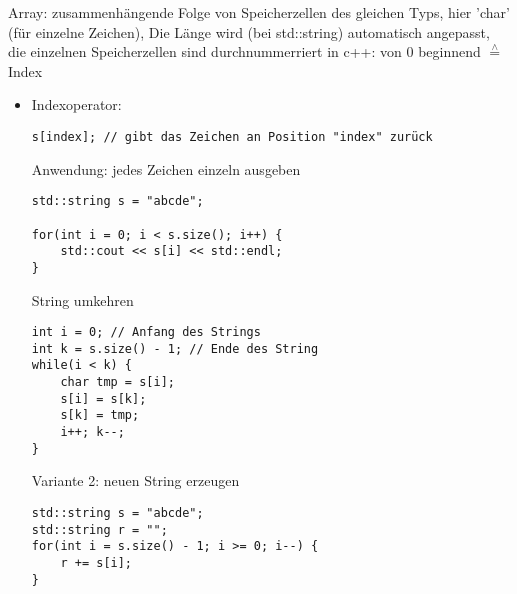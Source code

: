 \documentclass[a4paper]{scrartcl}
\newcommand{\estimates}{\overset{\scriptscriptstyle\wedge}{=}}%
\begin{document}
\begin{itemize}
\begin{itemize}
       Array: zusammenhängende Folge von Speicherzellen des gleichen Typs, hier 'char' (für einzelne Zeichen), Die Länge wird (bei std::string) automatisch angepasst, die einzelnen Speicherzellen sind durchnummerriert
in c++: von $0$ beginnend $\estimates$ Index
\begin{itemize}
\item Indexoperator:
\begin{verbatim}
s[index]; // gibt das Zeichen an Position "index" zurück
\end{verbatim}
Anwendung: jedes Zeichen einzeln ausgeben
\begin{verbatim}
std::string s = "abcde";

for(int i = 0; i < s.size(); i++) {
	std::cout << s[i] << std::endl;
}
\end{verbatim}
String umkehren
\begin{verbatim}
int i = 0; // Anfang des Strings
int k = s.size() - 1; // Ende des String
while(i < k) {
	char tmp = s[i];
	s[i] = s[k];
	s[k] = tmp;
	i++; k--;
}
\end{verbatim}
Variante 2: neuen String erzeugen
\begin{verbatim}
std::string s = "abcde";
std::string r = "";
for(int i = s.size() - 1; i >= 0; i--) {
	r += s[i];
}
\end{verbatim}
\end{itemize}
\end{itemize}
\end{itemize}
\end{document}
